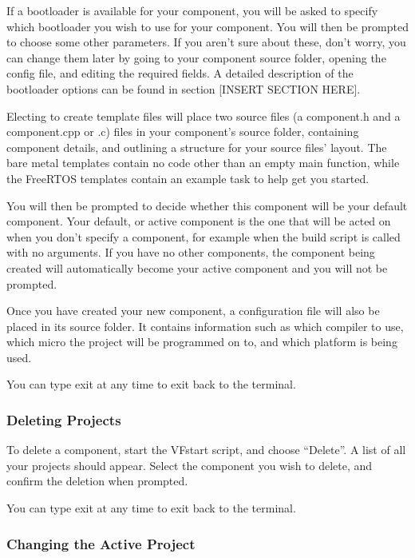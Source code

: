 \documentclass[a4paper, oneside, 11pt, titlepage, onecolumn, openright]{article}
\begin{document}
If a bootloader is available for your component, you will be asked to specify which bootloader you wish to use for your component. You will then be prompted to choose some other parameters. If you aren't sure about these, don't worry, you can change them later by going to your component source folder, opening the config file, and editing the required fields. A detailed description of the bootloader options can be found in section [INSERT SECTION HERE].


Electing to create template files will place two source files (a component.h and a component.cpp or .c) files in your component's source folder, containing component details, and outlining a structure for your source files' layout. The bare metal templates contain no code other than an empty main function, while the FreeRTOS templates contain an example task to help get you started.

You will then be prompted to decide whether this component will be your default component. Your default, or active component is the one that will be acted on when you don't specify a component, for example when the build script is called with no arguments. If you have no other components, the component being created will automatically become your active component and you will not be prompted.

Once you have created your new component, a configuration file will also be placed in its source folder. It contains information such as which compiler to use, which micro the project will be programmed on to, and which platform is being used.


You can type exit at any time to exit back to the terminal.


\subsubsection{Deleting Projects}
			\label{sss:Deleting Projects}

To delete a component, start the VFstart script, and choose ``Delete''. A list of all your projects should appear. Select the component you wish to delete, and confirm the deletion when prompted.

You can type exit at any time to exit back to the terminal.

\subsubsection{Changing the Active Project}
			\label{sss:Edit -> Default Proj}
\end{document}
